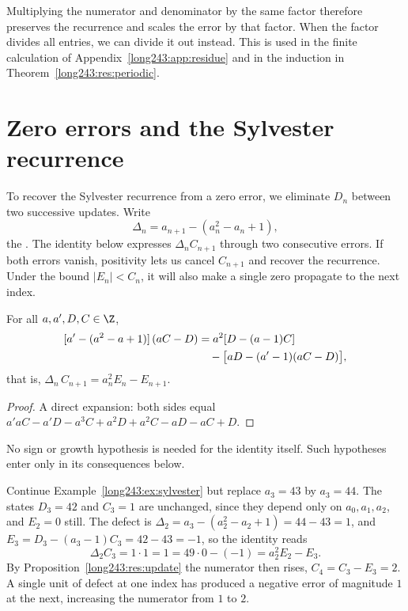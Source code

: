 Multiplying the numerator and denominator by the same factor therefore
preserves the recurrence and scales the error by that factor. When the
factor divides all entries, we can divide it out instead. This is used
in the finite calculation of Appendix~\ref{long243:app:residue} and in
the induction in Theorem~\ref{long243:res:periodic}.

\section{Zero errors and the Sylvester recurrence}\label{long243:sec:defect}

To recover the Sylvester recurrence from a zero error, we eliminate
$D_n$ between two successive updates. Write
\[
 \Delta_n=a_{n+1}-(a_n^2-a_n+1),
\]
the
. The identity below expresses $\Delta_nC_{n+1}$ through two
consecutive errors. If both errors vanish, positivity lets us cancel
$C_{n+1}$ and recover the recurrence. Under the bound $|E_n|<C_n$, it will
also make a single zero propagate to the next index.

\begin{theorem}\label{long243:res:defect}
For all $a,a',D,C\in\Z$,
\[
 \begin{aligned}
 \relax[a'-(a^2-a+1)]\,(aC-D)
 &=a^2[D-(a-1)C]\\
 &\quad-\bigl[aD-(a'-1)(aC-D)\bigr],
 \end{aligned}
\]
that is, $\Delta_n\,C_{n+1}=a_n^{2}E_n-E_{n+1}$.
\end{theorem}

\begin{proof}
A direct expansion: both sides equal
$a'aC-a'D-a^{3}C+a^{2}D+a^{2}C-aD-aC+D$.
\end{proof}

 No sign or growth hypothesis is needed for the identity itself.
Such hypotheses enter only in its consequences below.

\begin{example}\label{long243:ex:defect}
Continue Example~\ref{long243:ex:sylvester} but replace $a_3=43$ by $a_3=44$.  The
states $D_3=42$ and $C_3=1$ are unchanged, since they depend only on
$a_0,a_1,a_2$, and $E_2=0$ still.  The defect is
$\Delta_2=a_3-(a_2^2-a_2+1)=44-43=1$, and
$E_3=D_3-(a_3-1)C_3=42-43=-1$, so the identity reads
\[
 \Delta_2C_3=1\cdot1=1=49\cdot0-(-1)=a_2^{2}E_2-E_3 .
\]
By Proposition~\ref{long243:res:update} the numerator then rises, $C_4=C_3-E_3=2$.  A
single unit of defect at one index has produced a negative error of magnitude
$1$ at the next, increasing the numerator from $1$ to $2$.
\end{example}

